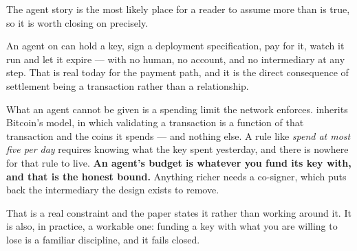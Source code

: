 The agent story is the most likely place for a reader to assume more than is true, so it is worth
closing on precisely.

An agent on \Flux{} can hold a key, sign a deployment specification, pay for it, watch it run and
let it expire --- with no human, no account, and no intermediary at any step. That is real today for
the payment path, and it is the direct consequence of settlement being a transaction rather than a
relationship.

What an agent cannot be given is a spending limit the network enforces. \Flux{} inherits Bitcoin's
model, in which validating a transaction is a function of that transaction and the coins it spends
--- and nothing else. A rule like \emph{spend at most five \flux{} per day} requires knowing what the
key spent yesterday, and there is nowhere for that rule to live. \textbf{An agent's budget is
whatever you fund its key with, and that is the honest bound.} Anything richer needs a co-signer,
which puts back the intermediary the design exists to remove.

That is a real constraint and the paper states it rather than working around it. It is also, in
practice, a workable one: funding a key with what you are willing to lose is a familiar discipline,
and it fails closed.
